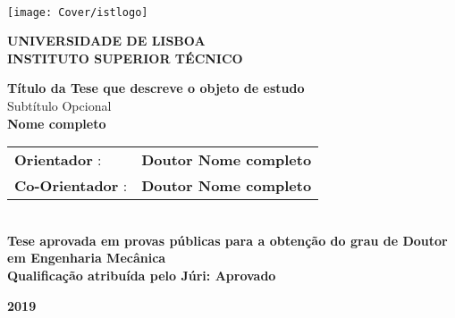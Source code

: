\setcounter{page}{1} 


\thispagestyle{empty}
\begin{flushleft} ~\\ \vspace{-12mm} \hspace{-12mm}  \texttt{[image: Cover/istlogo]} 
 
\centering
\LARGE \textbf{UNIVERSIDADE DE LISBOA \\ INSTITUTO SUPERIOR TÉCNICO}
\vspace{30mm}

 \vspace{5mm}
 
\centering
\LARGE \textbf{Título da Tese que descreve o objeto de estudo}
\\ \vspace{10mm}
\Large Subtítulo Opcional
\\ \vspace{15mm}
\LARGE \textbf{Nome completo} \\
\vspace{4cm}

\begin{minipage}{\textwidth}
\begin{tabularx}{\textwidth}{ l @{ } l }
\Large \textbf{Orientador} : & \textbf{Doutor Nome completo}\\
 \Large \textbf{Co-Orientador} :  & \textbf{Doutor Nome completo}\\
\end{tabularx}

\end{minipage}
%
\\ \vspace{20mm}
\centering
\Large \textbf{Tese aprovada em provas públicas para a obtenção do grau de Doutor em Engenharia Mecânica}\\
\vspace{8mm}
\Large \textbf{Qualificação atribuída pelo Júri: Aprovado}
 
\vspace{20mm}

\large \textbf{2019} \\
\let\thepage\relax
\end{flushleft}
\pagebreak
